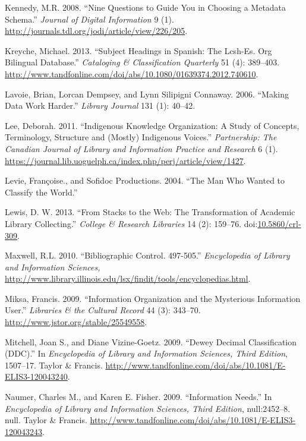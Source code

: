 \documentclass[]{article}
\begin{document}
\hypertarget{ref-kennedyux5fnineux5f2008}{}
Kennedy, M.R. 2008. ``Nine Questions to Guide You in Choosing a Metadata
Schema.'' \emph{Journal of Digital Information} 9 (1).
\url{http://journals.tdl.org/jodi/article/view/226/205}.

\hypertarget{ref-kreycheux5fsubjectux5f2013}{}
Kreyche, Michael. 2013. ``Subject Headings in Spanish: The Lcsh-Es. Org
Bilingual Database.'' \emph{Cataloging \& Classification Quarterly} 51
(4): 389--403.
\url{http://www.tandfonline.com/doi/abs/10.1080/01639374.2012.740610}.

\hypertarget{ref-lavoieux5fmakingux5f2006}{}
Lavoie, Brian, Lorcan Dempsey, and Lynn Silipigni Connaway. 2006.
``Making Data Work Harder.'' \emph{Library Journal} 131 (1): 40--42.

\hypertarget{ref-leeux5findigenousux5f2011}{}
Lee, Deborah. 2011. ``Indigenous Knowledge Organization: A Study of
Concepts, Terminology, Structure and (Mostly) Indigenous Voices.''
\emph{Partnership: The Canadian Journal of Library and Information
Practice and Research} 6 (1).
\url{https://journal.lib.uoguelph.ca/index.php/perj/article/view/1427}.

\hypertarget{ref-levieux5fmanux5f2004}{}
Levie, Françoise., and Sofidoc Productions. 2004. ``The Man Who Wanted
to Classify the World.''

\hypertarget{ref-lewisux5fstacksux5f2013}{}
Lewis, D. W. 2013. ``From Stacks to the Web: The Transformation of
Academic Library Collecting.'' \emph{College \& Research Libraries} 14
(2): 159--76.
doi:\href{https://doi.org/10.5860/crl-309}{10.5860/crl-309}.

\hypertarget{ref-maxwellux5fbibliographicux5f2010}{}
Maxwell, R.L. 2010. ``Bibliographic Control. 497-505.''
\emph{Encyclopedia of Library and Information Sciences,}
\url{http://www.library.illinois.edu/lsx/findit/tools/encyclopedias.html}.

\hypertarget{ref-miksaux5finformationux5f2009}{}
Miksa, Francis. 2009. ``Information Organization and the Mysterious
Information User.'' \emph{Libraries \& the Cultural Record} 44 (3):
343--70. \url{http://www.jstor.org/stable/25549558}.

\hypertarget{ref-mitchellux5fdeweyux5f2009}{}
Mitchell, Joan S., and Diane Vizine-Goetz. 2009. ``Dewey Decimal
Classification (DDC).'' In \emph{Encyclopedia of Library and Information
Sciences, Third Edition}, 1507--17. Taylor \& Francis.
\url{http://www.tandfonline.com/doi/abs/10.1081/E-ELIS3-120043240}.

\hypertarget{ref-naumerux5finformationux5f2009}{}
Naumer, Charles M., and Karen E. Fisher. 2009. ``Information Needs.'' In
\emph{Encyclopedia of Library and Information Sciences, Third Edition},
null:2452--8. null. Taylor \& Francis.
\url{http://www.tandfonline.com/doi/abs/10.1081/E-ELIS3-120043243}.
\end{document}
